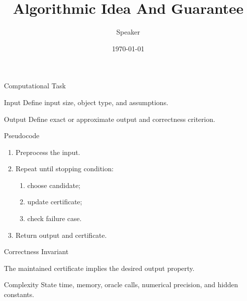 \documentclass[10pt,aspectratio=169]{beamer}
\title{Algorithmic Idea And Guarantee}
\author{Speaker}
\date{\today}
\begin{document}
\begin{frame}\titlepage\end{frame}

\begin{frame}{Computational Task}
  \begin{block}{Input}
    Define input size, object type, and assumptions.
  \end{block}
  \begin{block}{Output}
    Define exact or approximate output and correctness criterion.
  \end{block}
\end{frame}

\begin{frame}{Pseudocode}
  \begin{enumerate}
    \item Preprocess the input.
    \item Repeat until stopping condition:
      \begin{enumerate}
        \item choose candidate;
        \item update certificate;
        \item check failure case.
      \end{enumerate}
    \item Return output and certificate.
  \end{enumerate}
\end{frame}

\begin{frame}{Correctness Invariant}
  \begin{lemma}
    The maintained certificate implies the desired output property.
  \end{lemma}
\end{frame}

\begin{frame}{Complexity}
  State time, memory, oracle calls, numerical precision, and hidden constants.
\end{frame}
\end{document}
